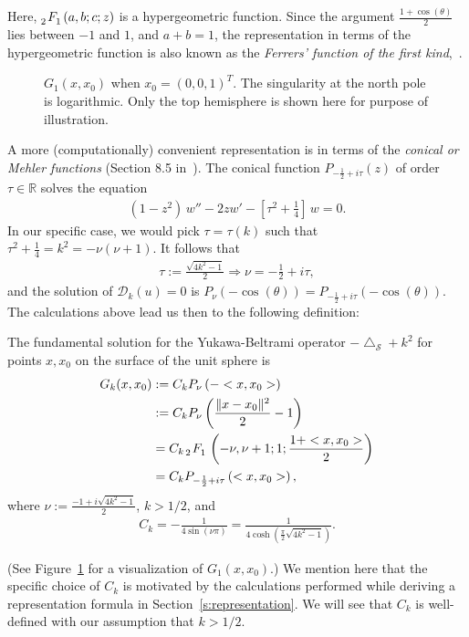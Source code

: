 \documentclass[final]{siamltex}
\newcommand{\lap}{\bigtriangleup}
\newcommand{\C}{C_k}
\renewcommand{\S} {\mathcal{S}}
\begin{document}
Here, $\tensor[_2]{F}{_1}(a,b;c;z)$ is a hypergeometric function. Since
the argument $\frac{1+\cos(\theta)}{2}$ lies between $-1$ and $1$, and
$a+b = 1$, the representation in terms of the hypergeometric function is
also known as the {\it Ferrers' function of the first
kind},~\cite{fatAbramowitz}. 

\begin{figure}
  \centering
  
  \caption{\label{f:greensFun} $G_1(x,x_0)$ when $x_0=(0,0,1)^T$. The
  singularity at the north pole is logarithmic. Only the top hemisphere
  is shown here for purpose of illustration.}
\end{figure}
A more (computationally) convenient representation is in terms of the
{\it conical or Mehler functions} (Section 8.5 in~\cite{lebedev}). The
conical function $P_{-\frac{1}{2}+ i \tau}(z)$ of order $\tau\in \mathbb{R}$ solves
the equation
\begin{align*}
  (1-z^2)\,w'' -2zw' - \left[\tau^2+\frac{1}{4}\right]\,w = 0.
\end{align*}
In our specific case, we would pick $\tau = \tau(k)$ such that
$\tau^2+\frac{1}{4}=k^2 = -\nu(\nu+1).$  It follows that 
\begin{align*}
  \tau:=\frac{\sqrt{4k^2-1}}{2} \Rightarrow  \nu= -\frac{1}{2}+i\tau, 
\end{align*}
and the solution of $\mathcal{D}_k(u)=0$ is $
  P_{\nu} (-\cos(\theta)) = P_{-\frac{1}{2} + i \tau} 
    (-\cos(\theta)).$
The calculations above lead us then to the following definition:

\begin{definition}
\label{fundamentaldef} 
The fundamental solution for the Yukawa-Beltrami operator $-\lap_\S +
k^2$ for points $x,x_0$ on the surface of the unit sphere is 
\begin{subequations}
  \begin{align}
    G_k(x,x_{0})&:=\C P_{\nu}\left(-<x,x_{0}>\right) \nonumber \\
    &:=\C P_{\nu}\left(\frac{\|x-x_{0}\|^2}{2}-1\right) \label{LegP} \\
    &= \C\, \tensor[_2]{F}{_1} \left(-\nu, \nu+1; 1; 
      \frac{1+<x,x_{0}>}{2}\right)\label{hyperG} \\
    &=\C P_{-\frac{1}{2} + i \tau}
    \left(<x,x_{0}>\right) \label{conicalP},
  \end{align} 
\end{subequations}
where 
$\nu:=\frac{-1+i\sqrt{4k^2-1}}{2}$, $k>1/2$, and 
\begin{align}
  \label{constant-definition}    
  \C=-\frac{1}{4\sin(\nu\pi)} 
    =\frac{1}{4\cosh(\frac{\pi}{2}\sqrt{4k^2-1})}.
\end{align}
\end{definition} 
(See Figure~\ref{f:greensFun} for a visualization of $G_1(x,x_0)$.) We
mention here that the specific choice of $\C$ is motivated by the
calculations performed while deriving a representation formula in
Section~\ref{s:representation}.  We will see that $\C$ is well-defined
with our assumption that $k>1/2$.
\end{document}
